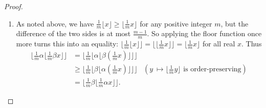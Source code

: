 \documentclass[12pt,letterpaper, reqno]{amsart}
\newtheorem{prop}[thm]{Proposition}
\theoremstyle{definition}
\theoremstyle{remark}
\newcommand{\floor}[1]{\lfloor{#1}\rfloor}
\begin{document}
\begin{proof}
\begin{enumerate}
\\
\item As noted above, we have $\frac1m\floor{x}\geq \floor{\frac1m x}$ for any positive integer $m$, but the difference of the two sides is at most $\frac{m-1}{m}$. So applying the floor function once more turns this into an {equality}: $\floor{\frac1m\floor{x}} = \floor{\floor{\frac1m x}} = \floor{\frac1m x}$ for all real $x$. Thus
\begin{align*}
\floor{\frac1m\alpha\floor{\frac1m\beta x}} &= \floor{\frac1m\floor{\alpha\floor{\beta(\frac1m x)}}} \\
&\geq \floor{\frac1m\floor{\beta\floor{\alpha(\frac1m x)}}} & (y\
\mapsto \floor{\frac1m y} \text{  is order-preserving})\\
&= \floor{\frac1m\beta\floor{\frac1m\alpha x}} .
\end{align*}

\end{enumerate}

\end{proof}


\end{document}
